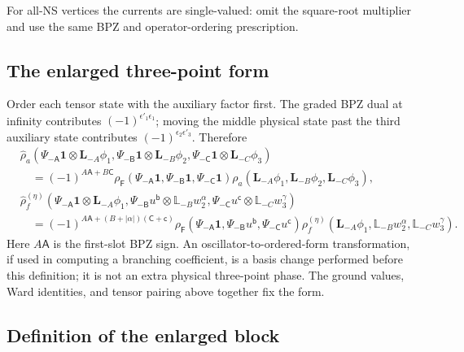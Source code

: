 \documentclass[11pt]{article}
\newcommand{\F}{\mathsf F}
\numberwithin{equation}{section}
\begin{document}
For all-NS vertices the currents are single-valued: omit the square-root
multiplier and use the same BPZ and operator-ordering prescription.


\subsection{The enlarged three-point form}

Order each tensor state with the auxiliary factor first. The graded
BPZ dual at infinity contributes
$(-1)^{\epsilon'_1\epsilon_1}$; moving the middle physical state
past the third auxiliary state contributes
$(-1)^{\epsilon_2\epsilon'_3}$. Therefore
\begin{align}
 &\hat\rho_a(\Psi_{-\mathsf A}\mathbf1\otimes\mathbf L_{-A}\phi_1,
 \Psi_{-\mathsf B}\mathbf1\otimes\mathbf L_{-B}\phi_2,
 \Psi_{-\mathsf C}\mathbf1\otimes\mathbf L_{-C}\phi_3)\nonumber\\
 &\quad=(-1)^{A\mathsf A+B\mathsf C}
 \rho_{\F}(\Psi_{-\mathsf A}\mathbf1,\Psi_{-\mathsf B}\mathbf1,
                                      \Psi_{-\mathsf C}\mathbf1)
 \rho_a(\mathbf L_{-A}\phi_1,\mathbf L_{-B}\phi_2,\mathbf L_{-C}\phi_3),
 \label{eq:ns-vertex}\\
 &\hat\rho_f^{(\eta)}(\Psi_{-\mathsf A}\mathbf1\otimes\mathbf L_{-A}\phi_1,
 \Psi_{-\mathsf B}u^{\mathsf b}\otimes\mathbb L_{-B}w_2^\alpha,
 \Psi_{-\mathsf C}u^{\mathsf c}\otimes\mathbb L_{-C}w_3^\gamma)\nonumber\\
 &\quad=(-1)^{A\mathsf A+(B+|\alpha|)(\mathsf C+\mathsf c)}
 \rho_{\F}(\Psi_{-\mathsf A}\mathbf1,\Psi_{-\mathsf B}u^{\mathsf b},
                                      \Psi_{-\mathsf C}u^{\mathsf c})
 \rho_f^{(\eta)}(\mathbf L_{-A}\phi_1,\mathbb L_{-B}w_2^\alpha,
                                      \mathbb L_{-C}w_3^\gamma).
 \label{eq:ramond-vertex}
\end{align}
Here $A\mathsf A$ is the first-slot BPZ sign. An
oscillator-to-ordered-form transformation, if used in computing a
branching coefficient, is a basis change performed before this
definition; it is not an extra physical three-point phase. The
ground values, Ward identities, and tensor pairing above together
fix the form.

\subsection{Definition of the enlarged block}
\end{document}
